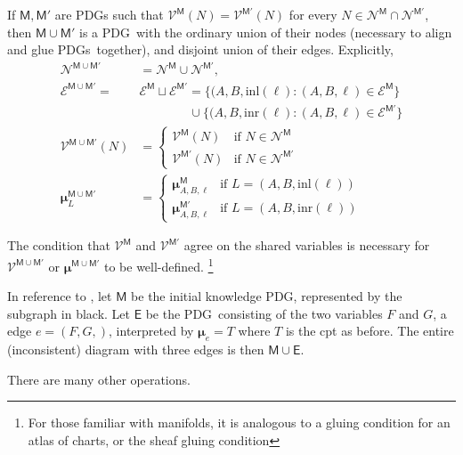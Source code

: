 \documentclass{article}
\newcommand{\notation}[2][]{#1}
\renewcommand{\notation}[2][]{{\color{notationcolor} #2}}
\newcommand{\vfullfootnote}[1]{}
\renewcommand{\vfullfootnote}[1]{\footnote{#1}}
\newcommand{\bmu}{\boldsymbol{\mu}}
\newcommand{\V}{\mathcal V}
\newcommand{\N}{\mathcal N}
\newcommand{\Ed}{\mathcal E}
\newcommand{\sfM}{\mathsf M}
\newcommand{\MN}{PDG}
\newcommand{\MNs}{\MN s}
\numberwithin{equation}{section}
\begin{document}
\begin{notfocus}
{	\begin{defn}[union] \label{def:model-union}
		If $\sfM, \sfM'$ are \MN s such that $\V^\sfM(N) = \V^{\sfM'}(N)$ for every $N \in  \N^{\sfM} \cap \N^{\sfM'}$, then $\sfM \cup \sfM'$ is a \MN\ with the ordinary union of their nodes (necessary to align and glue \MNs\ together), and disjoint union of their edges. \notation{Explicitly,
		\begin{align*}
			\N^{\sfM \cup \sfM'} &= \N^\sfM \cup \N^{\sfM'},  \\
			\Ed^{\sfM \cup \sfM'} \!=& \Ed^\sfM \sqcup \Ed^{\sfM'}\!
				=  \{ (A, B, \text{inl}(\ell) : (A,B,\ell)\in \Ed^\sfM \}  \\
					&\qquad\qquad \cup \{ (A, B, \text{inr}(\ell) : (A,B,\ell)\in \Ed^{\sfM'} \} \\ 
			\V^{\sfM \cup \sfM'} (N) &= \begin{cases}
					\V^{\sfM}(N) & \text{if }N \in \N^\sfM \\
					\V^{\sfM'}(N) &\text{if }N \in \N^{\sfM'} 
				\end{cases}\\
			\bmu^{\sfM \cup \sfM'}_L &= \begin{cases}
				\bmu^{\sfM}_{A, B, \ell} &\text{if } L = (A, B, \text{inl} (\ell)) \\
				\bmu^{\sfM'}_{A, B, \ell} &\text{if } L = (A, B, \text{inr} (\ell)) 
			\end{cases}
		\end{align*}}
	\end{defn}
	The condition that $\V^\sfM$ and $\V^{\sfM'}$ agree on the shared variables is necessary for $\V^{\sfM\cup \sfM'}$ or $\bmu^{\sfM \cup \sfM'}$ to be well-defined.%
		\vfullfootnote{For those familiar with manifolds, it is analogous to a gluing condition for an atlas of charts, or the sheaf gluing condition}
	
	\begin{example}[continues=ex:guns-and-floomps]
		In reference to , let $\sfM$ be the initial knowledge \MN, represented by the subgraph 
		in black. Let $\mathsf E$ be the \MN\ consisting of the two variables $F$ and $G$, a edge $e = (F, G,)$, interpreted by $\bmu_{e} = T$ where $T$ is the cpt as before. The entire (inconsistent) diagram with three edges is then
		$ \sfM \cup \mathsf E$.
	\end{example}

	There are many other operations. 
}
			

\end{notfocus}
\end{document}
